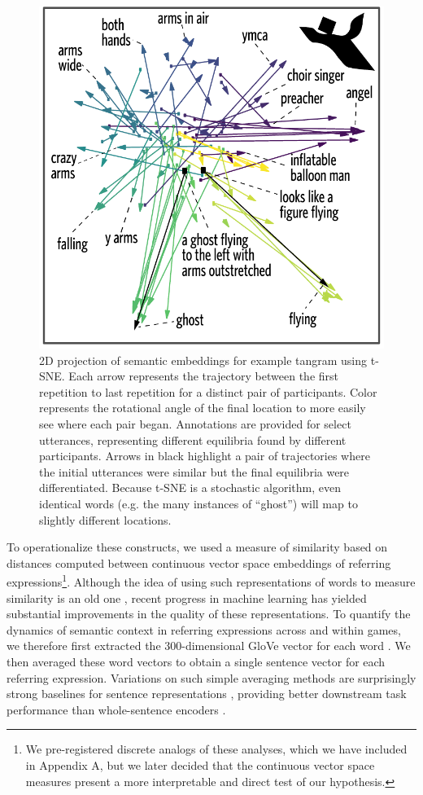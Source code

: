 \documentclass[alpha-refs]{wiley-article}
\begin{document}
\begin{figure}[t!]
\centering
\includegraphics[scale=.8]{tsne-tangramC_annotated.pdf}
\caption{2D projection of semantic embeddings for example tangram using t-SNE. Each arrow represents the trajectory between the first repetition to last repetition for a distinct pair of participants. Color represents the rotational angle of the final location to more easily see where each pair began. Annotations are provided for select utterances, representing different equilibria found by different participants. Arrows in black highlight a pair of trajectories where the initial utterances were similar but the final equilibria were differentiated. Because t-SNE is a stochastic algorithm, even identical words (e.g. the many instances of ``ghost'') will map to slightly different locations.}
\label{fig:tsne}
\end{figure}


To operationalize these constructs, we used a measure of similarity based on distances computed between continuous vector space embeddings of referring expressions\footnote{We pre-registered discrete analogs of these analyses, which we have included in Appendix A, but we later decided that the continuous vector space measures present a more interpretable and direct test of our hypothesis.}.
Although the idea of using such representations of words to measure similarity is an old one \citep{osgood1952nature,landauer_solution_1997,bengio_neural_2003}, recent progress in machine learning has yielded substantial improvements in the quality of these representations.
To quantify the dynamics of semantic context in referring expressions across and within games, we therefore first extracted the 300-dimensional GloVe vector for each word \citep{pennington2014glove}.
We then averaged these word vectors to obtain a single sentence vector for each referring expression.
Variations on such simple averaging methods are surprisingly strong baselines for sentence representations \citep{arora2017asimple}, providing better downstream task performance than whole-sentence encoders \citep{KirosEtAl15_SkipThought}.
\end{document}
